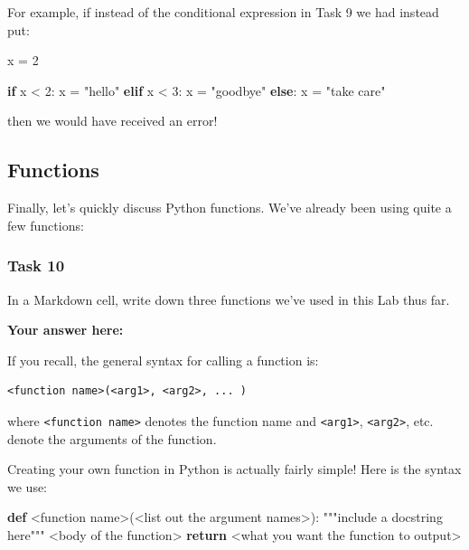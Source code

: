 \documentclass[
  11pt,
]{article}
\newenvironment{Shaded}{\begin{snugshade}}{\end{snugshade}}
\newcommand{\BuiltInTok}[1]{\textcolor[rgb]{0.00,0.23,0.31}{#1}}
\newcommand{\CommentTok}[1]{\textcolor[rgb]{0.37,0.37,0.37}{#1}}
\newcommand{\ControlFlowTok}[1]{\textcolor[rgb]{0.00,0.23,0.31}{\textbf{#1}}}
\newcommand{\DecValTok}[1]{\textcolor[rgb]{0.68,0.00,0.00}{#1}}
\newcommand{\KeywordTok}[1]{\textcolor[rgb]{0.00,0.23,0.31}{\textbf{#1}}}
\newcommand{\NormalTok}[1]{\textcolor[rgb]{0.00,0.23,0.31}{#1}}
\newcommand{\OperatorTok}[1]{\textcolor[rgb]{0.37,0.37,0.37}{#1}}
\newcommand{\StringTok}[1]{\textcolor[rgb]{0.13,0.47,0.30}{#1}}
\begin{document}
For example, if instead of the conditional expression in Task 9 we had
instead put:

\begin{Shaded}
\begin{Highlighting}[]
\NormalTok{x }\OperatorTok{=} \DecValTok{2}

\ControlFlowTok{if}\NormalTok{ x }\OperatorTok{\textless{}} \DecValTok{2}\NormalTok{:}
\NormalTok{x }\OperatorTok{=} \StringTok{"hello"}
\ControlFlowTok{elif}\NormalTok{ x }\OperatorTok{\textless{}} \DecValTok{3}\NormalTok{:}
\NormalTok{x }\OperatorTok{=} \StringTok{"goodbye"}
\ControlFlowTok{else}\NormalTok{:}
\NormalTok{x }\OperatorTok{=} \StringTok{"take care"}
\end{Highlighting}
\end{Shaded}

then we would have received an error!

\subsection{Functions}\label{functions}

Finally, let's quickly discuss Python functions. We've already been
using quite a few functions:

\subsubsection{Task 10}\label{task-10}

In a Markdown cell, write down three functions we've used in this Lab
thus far.

\textbf{Your answer here:}

If you recall, the general syntax for calling a function is:

\begin{verbatim}
<function name>(<arg1>, <arg2>, ... )
\end{verbatim}

where \texttt{\textless{}function\ name\textgreater{}} denotes the
function name and \texttt{\textless{}arg1\textgreater{}},
\texttt{\textless{}arg2\textgreater{}}, etc. denote the arguments of the
function.

Creating your own function in Python is actually fairly simple! Here is
the syntax we use:

\begin{Shaded}
\begin{Highlighting}[]
\KeywordTok{def} \OperatorTok{\textless{}}\NormalTok{function name}\OperatorTok{\textgreater{}}\NormalTok{(}\OperatorTok{\textless{}}\BuiltInTok{list}\NormalTok{ out the argument names}\OperatorTok{\textgreater{}}\NormalTok{):}
    \CommentTok{"""include a \textquotesingle{}docstring\textquotesingle{} here"""}
    \OperatorTok{\textless{}}\NormalTok{body of the function}\OperatorTok{\textgreater{}}
    \ControlFlowTok{return} \OperatorTok{\textless{}}\NormalTok{what you want the function to output}\OperatorTok{\textgreater{}}
\end{Highlighting}
\end{Shaded}
\end{document}

